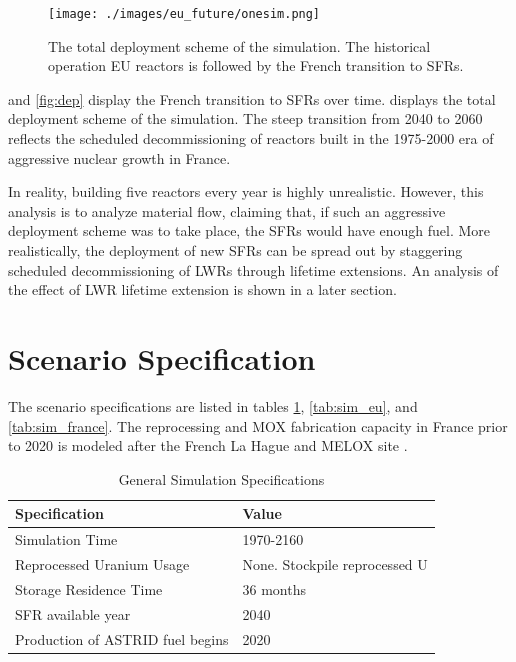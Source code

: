\begin{figure}[htbp!]
    \begin{center}
        \texttt{[image: ./images/eu\_future/onesim.png]}
    \end{center}
    \caption{The total deployment scheme of the simulation. The historical
             operation \gls{EU} reactors is followed by the French
             transition to \glspl{SFR}.}
    \label{fig:tot_dep}
\end{figure}


 and \ref{fig:dep} display
the French transition to \glspl{SFR} over time.
 displays the total deployment
scheme of the simulation.
The steep transition from 2040 to 2060 reflects the scheduled
decommissioning of reactors built in the 1975-2000
era of aggressive nuclear growth in France.

In reality, building five reactors every year is highly unrealistic. However,
this analysis is to analyze material flow, claiming that, if such an aggressive
deployment scheme was to take place, the \glspl{SFR} would have enough fuel.
More realistically, the deployment of new \glspl{SFR} can be spread out by
staggering scheduled decommissioning of \glspl{LWR} through lifetime extensions.
An analysis of the effect of \gls{LWR} lifetime extension is shown in a later section.



\section{Scenario Specification}

The scenario specifications  are
listed in tables \ref{tab:gen}, \ref{tab:sim_eu}, and \ref{tab:sim_france}.
The reprocessing and \gls{MOX} fabrication capacity in France
prior to 2020 is modeled after the 
French La Hague and MELOX site \cite{schneider_spent_2008, hugelmann_melox_1999}.


\begin{table}[h]
    \centering
    \begin{tabularx}{\textwidth}{bb}
        \hline
        \textbf{Specification} &\textbf{ Value} \\
        \hline
        Simulation Time & 1970-2160 \\ 
        Reprocessed Uranium Usage &  None. Stockpile reprocessed U \\
        Storage Residence Time & 36 months \\
        \gls{SFR} available year & 2040 \\
        Production of \gls{ASTRID} fuel begins & 2020 \\
        \hline
    \end{tabularx}
    \caption {General Simulation Specifications}
    \label{tab:gen}
\end{table}

